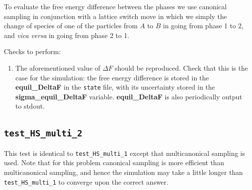 \documentclass{report}
\begin{document}
To evaluate the free energy difference between the phases we use canonical sampling in conjunction with a lattice switch move in which we simply the 
change of species of one of the particles from $A$ to $B$ in going from phase 1 to 2, and \emph{vica versa} in going from phase 2 to 1.

Checks to perform:
\begin{enumerate}
\item The aforementioned value of $\Delta F$ should be reproduced. Check that this is the case for the
simulation: the free energy difference is stored in the \textbf{equil\_DeltaF} in the \texttt{state} file, with its uncertainty
stored in the \textbf{sigma\_equil\_DeltaF} variable. \textbf{equil\_DeltaF} is also periodically output to stdout.
\end{enumerate}


\subsection{\texttt{test\_HS\_multi\_2}}
This test is identical to \texttt{test\_HS\_multi\_1} except that multicanonical sampling is used. Note that for this problem canonical sampling
is more efficient than multicanonical sampling, and hence the simulation may take a little longer than \texttt{test\_HS\_multi\_1} to converge
upon the correct answer.




\end{document}
